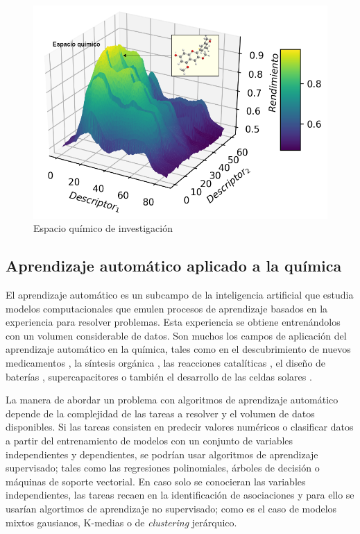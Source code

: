 \begin{figure}[h!]
    \begin{center}
        \includegraphics[scale=0.45]{img/espacioquimico.png}
    \end{center}
    \label{img:espacioquimico}
    \caption{Espacio químico de investigación}
\end{figure}



\subsection{Aprendizaje automático aplicado a la química}

El aprendizaje automático es un subcampo de la inteligencia artificial que estudia modelos computacionales que emulen procesos de aprendizaje basados en la experiencia para resolver problemas. Esta experiencia se obtiene entrenándolos con un volumen considerable de datos. Son muchos los campos de aplicación del aprendizaje automático en la química, tales como en el descubrimiento de nuevos medicamentos \cite{vamathevan2019applications}, la síntesis orgánica \cite{maryasin2018machine}, las reacciones catalíticas \cite{kitchin2018machine}, el diseño de baterías \cite{liu2020machine}, supercapacitores \cite{zhu2018artificial} o también el desarrollo de las celdas solares \cite{mahmood2021machine}. 

La manera de abordar un problema con algoritmos de aprendizaje automático depende de la complejidad de las tareas a resolver y el volumen de datos disponibles. Si las tareas consisten en predecir valores numéricos o clasificar datos a partir del entrenamiento de modelos con un conjunto de variables independientes y dependientes, se podrían usar algoritmos de aprendizaje supervisado; tales como las regresiones polinomiales, árboles de decisión o máquinas de soporte vectorial. En caso solo se conocieran las variables independientes, las tareas recaen en la identificación de asociaciones y para ello se usarían algortimos de aprendizaje no supervisado; como es el caso de modelos mixtos gausianos, K-medias o de \textit{clustering} jerárquico. 

